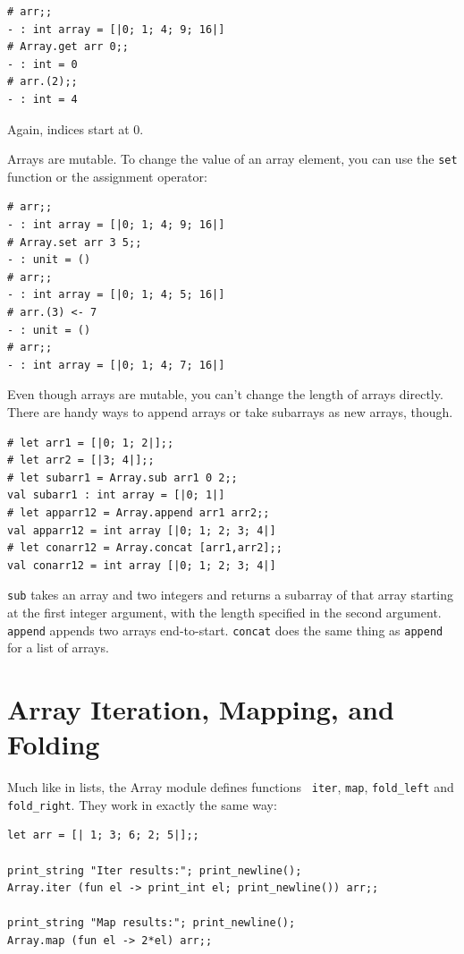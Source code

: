 \documentclass[10pt]{book}
\begin{document}
{\beforeverb
\begin{verbatim}
# arr;;
- : int array = [|0; 1; 4; 9; 16|]
# Array.get arr 0;;
- : int = 0
# arr.(2);;
- : int = 4
\end{verbatim}
\afterverb
Again, indices start at 0.

Arrays are mutable. To change the value of an array 
element, you can use the {\tt set} function or the 
assignment operator:

\beforeverb
\begin{verbatim}
# arr;;
- : int array = [|0; 1; 4; 9; 16|]
# Array.set arr 3 5;;
- : unit = ()
# arr;;
- : int array = [|0; 1; 4; 5; 16|]
# arr.(3) <- 7
- : unit = ()
# arr;;
- : int array = [|0; 1; 4; 7; 16|]
\end{verbatim}
\afterverb

Even though arrays are mutable, you can't change the length 
of arrays directly. There are handy ways to append arrays 
or take subarrays as new arrays, though.

\beforeverb
\begin{verbatim}
# let arr1 = [|0; 1; 2|];;
# let arr2 = [|3; 4|];;
# let subarr1 = Array.sub arr1 0 2;;
val subarr1 : int array = [|0; 1|]
# let apparr12 = Array.append arr1 arr2;;
val apparr12 = int array [|0; 1; 2; 3; 4|]
# let conarr12 = Array.concat [arr1,arr2];;
val conarr12 = int array [|0; 1; 2; 3; 4|]
\end{verbatim}
\afterverb
{\tt sub} takes an array and two integers and returns a 
subarray of that array starting at the first integer 
argument, with the length specified in the second argument. 
{\tt append} appends two arrays end-to-start. {\tt concat} 
does the same thing as {\tt append} for a list of arrays.

\section{Array Iteration, Mapping, and Folding}

Much like in lists, the Array module defines functions {\tt 
iter}, {\tt map}, {\tt \verb"fold_left"} and {\tt \verb"fold_right"}. 
They work in exactly the same way:

\beforeverb
\begin{verbatim}
let arr = [| 1; 3; 6; 2; 5|];;

print_string "Iter results:"; print_newline();
Array.iter (fun el -> print_int el; print_newline()) arr;;

print_string "Map results:"; print_newline();
Array.map (fun el -> 2*el) arr;;


\end{verbatim}}
\end{document}
